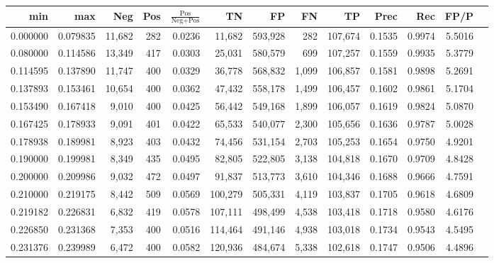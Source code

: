 \begin{tabular}{rrrrrrrrrrrrr}
\toprule
     min &      max &    Neg &   Pos & $\frac{\text{Pos}}{\text{Neg}+\text{Pos}}$ &      TN &      FP &      FN &      TP &   Prec &    Rec &   FP/P \\
\midrule
0.000000 & 0.079835 & 11,682 &   282 &                                     0.0236 &  11,682 & 593,928 &     282 & 107,674 & 0.1535 & 0.9974 & 5.5016 \\
0.080000 & 0.114586 & 13,349 &   417 &                                     0.0303 &  25,031 & 580,579 &     699 & 107,257 & 0.1559 & 0.9935 & 5.3779 \\
0.114595 & 0.137890 & 11,747 &   400 &                                     0.0329 &  36,778 & 568,832 &   1,099 & 106,857 & 0.1581 & 0.9898 & 5.2691 \\
0.137893 & 0.153461 & 10,654 &   400 &                                     0.0362 &  47,432 & 558,178 &   1,499 & 106,457 & 0.1602 & 0.9861 & 5.1704 \\
0.153490 & 0.167418 &  9,010 &   400 &                                     0.0425 &  56,442 & 549,168 &   1,899 & 106,057 & 0.1619 & 0.9824 & 5.0870 \\
0.167425 & 0.178933 &  9,091 &   401 &                                     0.0422 &  65,533 & 540,077 &   2,300 & 105,656 & 0.1636 & 0.9787 & 5.0028 \\
0.178938 & 0.189981 &  8,923 &   403 &                                     0.0432 &  74,456 & 531,154 &   2,703 & 105,253 & 0.1654 & 0.9750 & 4.9201 \\
0.190000 & 0.199981 &  8,349 &   435 &                                     0.0495 &  82,805 & 522,805 &   3,138 & 104,818 & 0.1670 & 0.9709 & 4.8428 \\
0.200000 & 0.209986 &  9,032 &   472 &                                     0.0497 &  91,837 & 513,773 &   3,610 & 104,346 & 0.1688 & 0.9666 & 4.7591 \\
0.210000 & 0.219175 &  8,442 &   509 &                                     0.0569 & 100,279 & 505,331 &   4,119 & 103,837 & 0.1705 & 0.9618 & 4.6809 \\
0.219182 & 0.226831 &  6,832 &   419 &                                     0.0578 & 107,111 & 498,499 &   4,538 & 103,418 & 0.1718 & 0.9580 & 4.6176 \\
0.226850 & 0.231368 &  7,353 &   400 &                                     0.0516 & 114,464 & 491,146 &   4,938 & 103,018 & 0.1734 & 0.9543 & 4.5495 \\
0.231376 & 0.239989 &  6,472 &   400 &                                     0.0582 & 120,936 & 484,674 &   5,338 & 102,618 & 0.1747 & 0.9506 & 4.4896 \\

\end{tabular}
